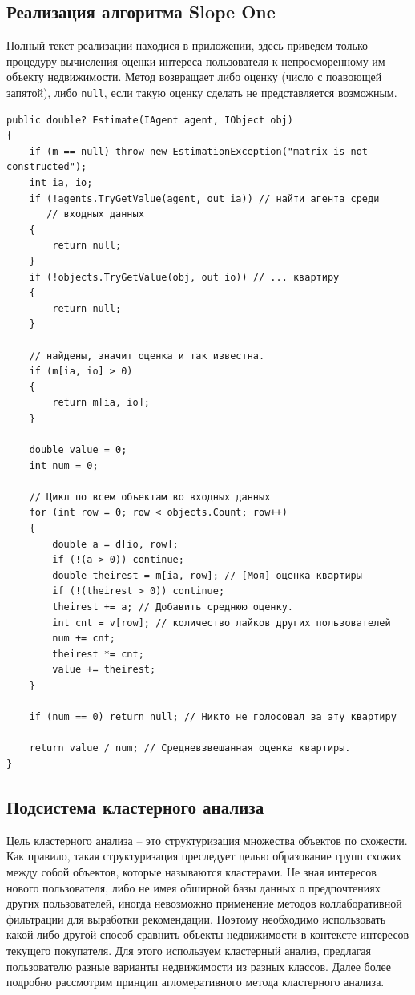 \documentclass[a4paper,14pt,openany,final]{extreport} %
\begin{document}
{\subsection{Реализация алгоритма Slope One}
Полный текст реализации находися в приложении, здесь приведем только процедуру вычисления оценки интереса пользователя к непросморенному им объекту недвижимости. Метод возвращает либо оценку (число с поавоющей запятой), либо \verb|null|, если такую оценку сделать не представляется возможным.
\begin{verbatim}
public double? Estimate(IAgent agent, IObject obj)
{
    if (m == null) throw new EstimationException("matrix is not constructed");
    int ia, io;
    if (!agents.TryGetValue(agent, out ia)) // найти агента среди
       // входных данных
    {
        return null;
    }
    if (!objects.TryGetValue(obj, out io)) // ... квартиру
    {
        return null;
    }

    // найдены, значит оценка и так известна.
    if (m[ia, io] > 0)
    {
        return m[ia, io];
    }

    double value = 0;
    int num = 0;

    // Цикл по всем объектам во входных данных
    for (int row = 0; row < objects.Count; row++)
    {
        double a = d[io, row];
        if (!(a > 0)) continue;
        double theirest = m[ia, row]; // [Моя] оценка квартиры
        if (!(theirest > 0)) continue;
        theirest += a; // Добавить среднюю оценку.
        int cnt = v[row]; // количество лайков других пользователей
        num += cnt;
        theirest *= cnt;
        value += theirest;
    }

    if (num == 0) return null; // Никто не голосовал за эту квартиру

    return value / num; // Средневзвешанная оценка квартиры.
}
\end{verbatim}

\subsection{Подсистема кластерного анализа}

Цель кластерного анализа -- это структуризация множества объектов по схожести. Как правило, такая структуризация преследует целью образование групп схожих между собой объектов, которые называются кластерами. Не зная интересов нового пользователя, либо не имея обширной базы данных о предпочтениях других пользователей, иногда невозможно применение методов коллаборативной фильтрации для выработки рекомендации. Поэтому необходимо использовать какой-либо другой способ сравнить объекты недвижимости в контексте интересов текущего покупателя. Для этого используем кластерный анализ, предлагая пользователю разные варианты недвижимости из разных классов. Далее более подробно рассмотрим принцип агломеративного метода кластерного анализа.

}
\end{document}
